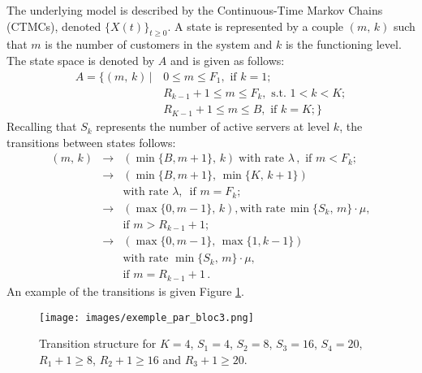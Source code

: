 \documentclass[conference]{IEEEtran}
\begin{document}
The underlying model is  described by the Continuous-Time Markov Chains (CTMCs), denoted   $\{X(t)\}_{t \geq 0}$.
A state is represented by a couple $(m,\,k)$ such that $m$ is the number of customers in the system and $k$ is the functioning level.
The state space is denoted by $A$ and is given as follows:
\begin{align*}
A=\{(m,\,k) \, | \,  & 0 \leq m \leq F_{1},  \text{ if } k=1 ; \\
                           & R_{k-1}+1 \leq m \leq F_{k}, \text{ s.t. } 1 < k < K ; \\
                           & R_{K-1}+1 \leq m \leq B,  \text{ if } k=K;
\}
\end{align*}
Recalling that   $S_{k}$ represents the number of active servers at level $k$, the transitions between states follows:
\begin{equation*}
\begin{array}{rcl}
\! \! (m,\,k)\! & \! \rightarrow & (\min\{B,m+1\},\,k) \; \text{with rate } \lambda \, , \text{ if } m < F_{k} ;\\
                & \! \rightarrow & (\min\{B,m+1\},\,\min\{K,\,k+1\}) \\
                & & \! \text{with rate } \lambda, \, \text{ if } m=F_{k} ; \\
                & \! \rightarrow &  (\max\{0,m-\!1\},\,k), \text{with rate} \, \min\{S_{k},\,m\} \! \cdot \! \mu,    \\
                & & \! \text{if } m \! > R_{k-1} \!+\! 1  ; \\
                & \! \rightarrow & (\max\{0,m-1\},\,\max\{1,k-1\}) \\
                & & \! \text{with rate }   \min\{S_{k},\,m\} \cdot \mu,    \\
                & & \! \text{if }   m=R_{k-1}+1  \, .
\end{array}
\end{equation*}
An example of the transitions is given Figure \ref{fig:image-chap4-exemple_par_bloc}.

\begin{figure}[hbtp]
\centering
\texttt{[image: images/exemple\_par\_bloc3.png]}
\caption{Transition structure for $K=4$, $S_1=4$, $S_2=8$, $S_3=16$, $S_4=20$, $R_1+1 \geq 8$, $R_2+1 \geq 16$ and $R_3+1 \geq 20$.}
  \label{fig:image-chap4-exemple_par_bloc}
\end{figure}
\end{document}
